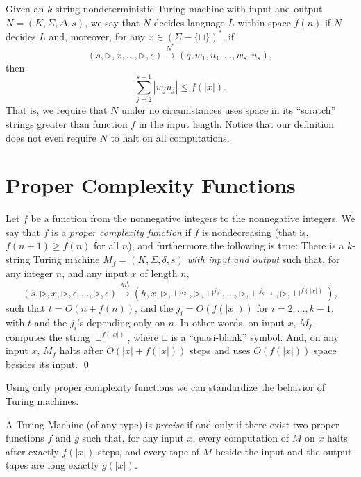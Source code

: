 \documentclass[12pt]{article}
\newcommand{\blank}{\sqcup}
\begin{document}
Given an $k$-string nondeterministic Turing machine with input and output 
$N = (K, \Sigma, \Delta, s)$, we say that $N$ decides language $L$ within space $f(n)$ if 
$N$ decides $L$ and, moreover, for any $x \in (\Sigma - \{\blank\})^*$, if 
\[
(s, \triangleright, x, \ldots, \triangleright, \epsilon) \xrightarrow{N^*} (q, w_1, u_1, \ldots, w_s, u_s),
\]
then 
\[
\sum_{j=2}^{s-1} |w_j u_j| \leq f(|x|).
\]
That is, we require that $N$ under no circumstances uses space in its ``scratch'' strings greater than function $f$ in the input length. Notice that our definition does not even require $N$ to halt on all computations.

\section{Proper Complexity Functions}
\begin{defbox}
  Let $f$ be a function from the nonnegative 
integers to the nonnegative integers. We say that $f$ is a \textit{proper complexity 
function} if $f$ is nondecreasing (that is, $f(n+1) \geq f(n)$ for all $n$), and furthermore 
the following is true: There is a $k$-string Turing machine $M_f = (K, \Sigma, \delta, s)$ 
\textit{with input and output} such that, for any integer $n$, and any input $x$ of length 
$n$, 
\[
(s, \triangleright, x, \triangleright, \epsilon, \ldots, \triangleright, \epsilon) 
\xrightarrow{M_f^t} 
(h, x, \triangleright, \sqcup^{j_2}, \triangleright, \sqcup^{j_3}, \ldots, 
\triangleright, \sqcup^{j_{k-1}}, \triangleright, \sqcup^{f(|x|)}),
\]
such that $t = O(n + f(n))$, and the $j_i = O(f(|x|))$ for $i = 2, \ldots, k - 1$, with $t$ and the 
$j_i$'s depending only on $n$. In other words, on input $x$, $M_f$ computes the string 
$\sqcup^{f(|x|)}$, where $\sqcup$ is a ``quasi-blank'' symbol. And, on any input $x$, $M_f$ halts after 
$O(|x| + f(|x|))$ steps and uses $O(f(|x|))$ space besides its input. \qed
\end{defbox}
Using only proper complexity functions we can standardize the behavior of Turing machines.
\begin{defbox}
  A Turing Machine (of any type) is \textit{precise} if and only if there exist two proper functions $f$ and $g$ such that, for any input $x$, every computation of $M$ on $x$ halts after exactly $f(|x|)$ steps, and every tape of $M$ beside the input and the output tapes are long exactly $g(|x|)$.
  
\end{defbox}
\end{document}
